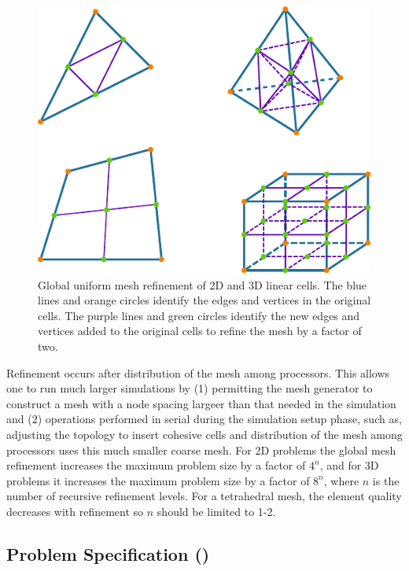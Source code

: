 \begin{figure}[htbp]
  \includegraphics[scale=1.25]{runpylith/figs/refinement2x}
  \caption{Global uniform mesh refinement of 2D and 3D linear
    cells. The blue lines and orange circles identify the edges and
    vertices in the original cells. The purple lines and green circles
    identify the new edges and vertices added to the original cells to
    refine the mesh by a factor of two.}
\label{fig:uniform:refinement:2x}
\end{figure}

Refinement occurs after distribution of the mesh among processors.
This allows one to run much larger simulations by (1) permitting the
mesh generator to construct a mesh with a node spacing largeer than
that needed in the simulation and (2) operations performed in serial
during the simulation setup phase, such as, adjusting the topology
to insert cohesive cells and distribution of the mesh among processors
uses this much smaller coarse mesh. For 2D problems the global mesh
refinement increases the maximum problem size by a factor of $4^{n}$,
and for 3D problems it increases the maximum problem size by a factor
of $8^{n}$, where $n$ is the number of recursive refinement levels.
For a tetrahedral mesh, the element quality decreases with refinement
so $n$ should be limited to 1-2.


\subsection{Problem Specification ()}

